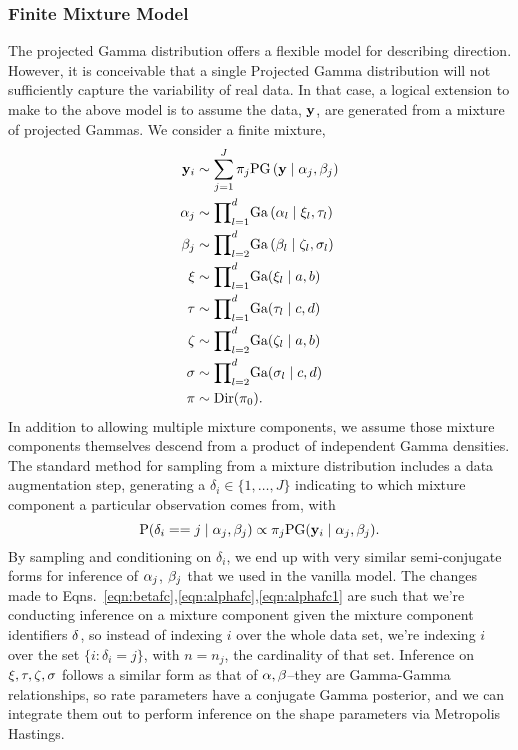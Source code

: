 \subsubsection{Finite Mixture Model}
The projected Gamma distribution offers a flexible model for describing direction.  However, it is
  conceivable that a single Projected Gamma distribution will not sufficiently capture the
  variability of real data.  In that case, a logical extension to make to the above model is to
  assume the data, ${\bf y}$, are generated from a mixture of projected Gammas.  We consider a finite
  mixture,
  \begin{equation}
    \label{eqn:fmixp}
    \begin{aligned}
      {\bf y}_i &\sim \sum_{j = 1}^J\pi_j\text{PG}\left({\bf y}\mid {\bf \alpha}_j, {\bf \beta}_j\right)\\
      {\bf \alpha}_j &\sim {\small \prod}_{l = 1}^d \text{Ga}\left(\alpha_l\mid\xi_l,\tau_l\right)\\
      {\bf \beta}_j &\sim {\small \prod}_{l = 2}^d \text{Ga}\left(\beta_l\mid\zeta_l,\sigma_l\right)\\
      {\bf \xi} &\sim {\small \prod}_{l = 1}^d \text{Ga}(\xi_l\mid a,b)\\
      {\bf \tau} &\sim {\small \prod}_{l = 1}^d \text{Ga}(\tau_l\mid c,d)\\
      {\bf \zeta} &\sim {\small\prod}_{l = 2}^d\text{Ga}(\zeta_l \mid a,b)\\
      {\bf \sigma} &\sim {\small\prod}_{l = 2}^d\text{Ga}(\sigma_l\mid c,d)\\
      {\bf \pi} &\sim \text{Dir}(\pi_0).
    \end{aligned}
  \end{equation}
  In addition to allowing multiple mixture components, we assume those mixture components themselves
  descend from a product of independent Gamma densities. The standard method for sampling from a
  mixture distribution includes a data augmentation step, generating a
  $\delta_i \in \lbrace 1,\ldots, J\rbrace$ indicating to which mixture component a
  particular observation comes from, with
  \begin{equation*}
    \text{P}(\delta_i == j\mid\alpha_j,\beta_j) \propto \pi_j\text{PG}({\bf y}_i\mid {\bf \alpha}_j,{\bf \beta}_j).
  \end{equation*}
  By sampling and conditioning on $\delta_i$, we end up with very similar semi-conjugate forms for
  inference of ${\bf \alpha}_j$, ${\bf \beta}_j$ that we used in the vanilla model.  The changes made
  to Eqns.~\ref{eqn:betafc},\ref{eqn:alphafc},\ref{eqn:alphafc1} are such that we're conducting inference
  on a mixture component given the mixture component identifiers ${\bf \delta}$, so instead of indexing
  $i$ over the whole data set, we're indexing $i$ over the set $\{i :\delta_i = j\}$, with $n = n_j$,
  the cardinality of that set. Inference on ${\bf \xi,\tau,\zeta,\sigma}$ follows a similar form as
  that of ${\bf \alpha,\beta}$--they are Gamma-Gamma relationships, so rate parameters have a conjugate
  Gamma posterior, and we can integrate them out to perform inference on the shape parameters via
  Metropolis Hastings.

